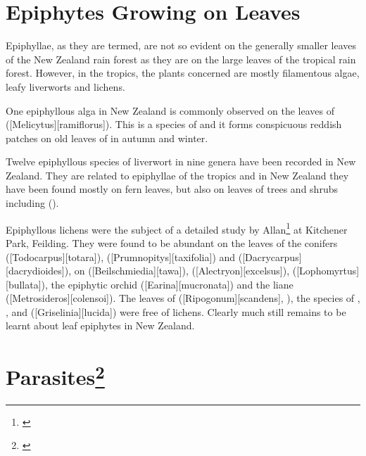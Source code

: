 \section{Epiphytes Growing on Leaves}

Epiphyllae, as they are termed, are not so evident on the generally smaller leaves of the New Zealand rain forest as they are on the large leaves of the tropical rain forest.
However, in the tropics, the plants concerned are mostly filamentous algae, leafy liverworts and lichens.

One epiphyllous alga in New Zealand is commonly observed on the leaves of  ([Melicytus][ramiflorus]).
This is a species of  and it forms conspicuous reddish patches on old leaves of  in autumn and winter.

Twelve epiphyllous species of liverwort in nine genera have been recorded in New Zealand.
They are related to epiphyllae of the tropics and in New Zealand they have been found mostly on fern leaves, but also on leaves of trees and shrubs including  ().

Epiphyllous lichens were the subject of a detailed study by Allan\footnote{\cite{zahlbruckner1928epiphyllous}} at Kitchener Park, Feilding.
They were found to be abundant on the leaves of the conifers  ([Todocarpus][totara]),  ([Prumnopitys][taxifolia]) and  ([Dacrycarpus][dacrydioides]), on  ([Beilschmiedia][tawa]),  ([Alectryon][excelsus]),  ([Lophomyrtus][bullata]), the epiphytic orchid  ([Earina][mucronata]) and the liane  ([Metrosideros][colensoi]).
The leaves of  ([Ripogonum][scandens], ), the species of , ,  and  ([Griselinia][lucida]) were free of lichens.
Clearly much still remains to be learnt about leaf epiphytes in New Zealand.

\section[Parasites]{Parasites\thinspace\footnote{\cite{fineran1974parasitic}}}


